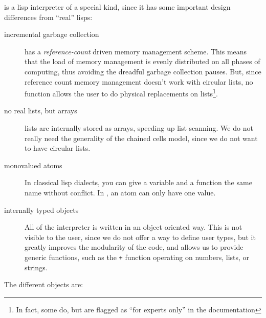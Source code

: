 {\WOOL} is a lisp interpreter of a special kind, since it has some important
design differences from ``real'' lisps:

\begin{description}

\item[incremental garbage collection] {\WOOL} has a {\sl reference-count}
driven memory management scheme. This means that the load of memory
management is evenly distributed on all phases of computing, thus avoiding
the dreadful garbage collection pauses. But, since reference count memory
management doesn't work with circular lists, no {\WOOL} function allows the
user to do physical replacements on lists\footnote{In fact, some do, but are
flagged as ``for experts only'' in the documentation}. 

\item[no real lists, but arrays] {\WOOL} lists are internally stored as
arrays, speeding up list scanning. We do not really need the
generality of the chained cells model, since we do not want to have circular
lists.

\item[monovalued atoms] In classical lisp dialects, you can give a variable
and a function the same name without conflict. In {\WOOL}, an atom can only
have one value.

\item[internally typed objects] All of the {\WOOL} interpreter is written in
an object oriented way. This is not visible to the user, since we do not
offer a way to define user types, but it greatly improves the modularity of
the code, and allows us to provide generic functions, such as the \verb"+"
function operating on numbers, lists, or strings.

\end{description}

The different {\WOOL} objects are:


